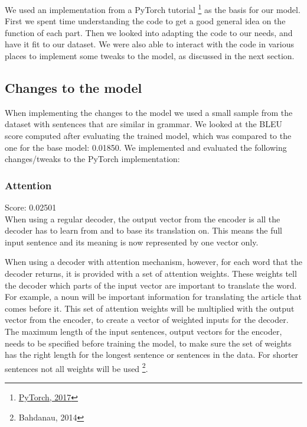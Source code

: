 \documentclass[11pt]{article}
\begin{document}
We used an implementation from a PyTorch tutorial \footnote[6]{\href{https://pytorch.org/tutorials/intermediate/seq2seq_translation_tutorial.html}{PyTorch, 2017}} as the basis for our model. First we spent time understanding the code to get a good general idea on the function of each part. Then we looked into adapting the code to our needs, and have it fit to our dataset. We were also able to interact with the code in various places to implement some tweaks to the model, as discussed in the next section.

\subsection{Changes to the model}
When implementing the changes to the model we used a small sample from the dataset with sentences that are similar in grammar. We looked at the BLEU score computed after evaluating the trained model, which was compared to the one for the base model: 0.01850. We implemented and evaluated the following changes/tweaks to the PyTorch implementation:

\subsubsection*{Attention}
Score: 0.02501
\\When using a regular decoder, the output vector from the encoder is all the decoder has to learn from and to base its translation on. This means the full input sentence and its meaning is now represented by one vector only.

When using a decoder with attention mechanism, however, for each word that the decoder returns, it is provided with a set of attention weights. These weights tell the decoder which parts of the input vector are important to translate the word. For example, a noun will be important information for translating the article that comes before it. This set of attention weights will be multiplied with the output vector from the encoder, to create a vector of weighted inputs for the decoder. The maximum length of the input sentences, output vectors for the encoder, needs to be specified before training the model, to make sure the set of weights has the right length for the longest sentence or sentences in the data. For shorter sentences not all weights will be used \footnote[7]{Bahdanau, 2014}. 
\end{document}
